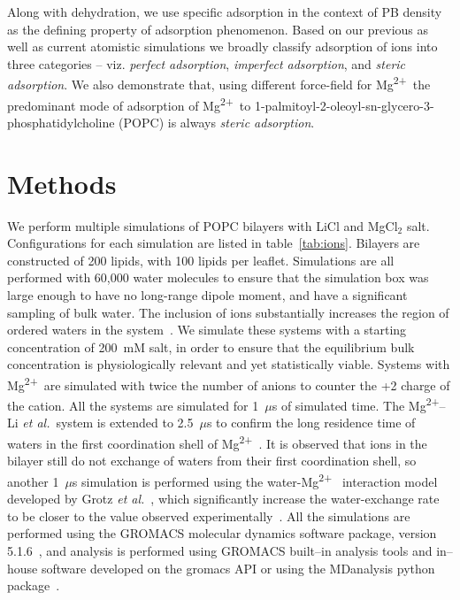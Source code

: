 \documentclass[journal=langd5,manuscript=article]{achemso}
\newcommand{\etal}{\textit{et al.}~}
\newcommand{\mg}{Mg\textsuperscript{2+}~}
\newcommand{\mgmbnbfix}{Mg\textsuperscript{2+}--Li \etal} %
\begin{document}
Along with dehydration, we use specific 
adsorption in the context of PB density 
as the defining property
of adsorption phenomenon. 
Based on our previous as well as current atomistic simulations we broadly
classify adsorption of ions into three categories -- viz. 
\emph{perfect adsorption}, \emph{imperfect adsorption},
and \emph{steric adsorption}. We also demonstrate that,
using different
force-field for \mg the predominant mode of adsorption
of \mg to 1-palmitoyl-2-oleoyl-sn-glycero-3-phosphatidylcholine (POPC) is 
{always} \emph{steric adsorption}.

\section{Methods}
We perform multiple simulations of POPC bilayers
with LiCl and MgCl$_{2}$ salt. Configurations for each simulation are listed in table~\ref{tab:ions}.
{Bilayers are constructed of 200 lipids, with 100 lipids per leaflet.}
Simulations are all performed with 
60,000 water molecules to ensure that the simulation box
was large enough to have no long-range dipole moment, 
and have a significant 
sampling of bulk water. The inclusion of ions substantially increases the region of ordered 
waters in the system~\cite{kruczek:2019,saunders:2022}.
We simulate these systems with a starting concentration of 200~mM salt, in order to ensure
that the equilibrium bulk concentration is physiologically relevant and 
{yet} statistically viable.
Systems with \mg are simulated with twice the number of 
anions to counter the +2 charge of the cation. All the systems are simulated for 1~$\mu$s of simulated time. 
The \mgmbnbfix system is extended to 2.5~$\mu$s to confirm the 
long residence time of waters in the first coordination shell of \mg\cite{grotz:2021:optimized}. 
It is observed that ions in the bilayer still do not
exchange of waters from their first coordination shell, 
so another 1~$\mu$s simulation is performed using the water-\mg 
interaction model developed by Grotz \etal, which significantly increase the water-exchange rate to be closer 
to the value observed experimentally~\cite{grotz:2021:optimized}.
{All the} simulations are performed using the GROMACS molecular dynamics software package, 
version 5.1.6~\cite{abraham:2015,pall:2014,van:2005,lindahl:2001,berendsen:1995}, and analysis is performed using 
GROMACS built--in analysis tools and in--house software developed
on the gromacs API or using the MDanalysis python package~\cite{gromacsmanual,mdanalysis1,mdanalysis2}.
\end{document}
